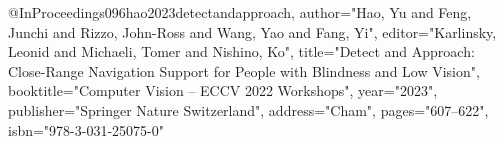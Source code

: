 @InProceedings{096hao2023detectandapproach,
author="Hao, Yu
and Feng, Junchi
and Rizzo, John-Ross
and Wang, Yao
and Fang, Yi",
editor="Karlinsky, Leonid
and Michaeli, Tomer
and Nishino, Ko",
title="Detect and Approach: Close-Range Navigation Support for People with Blindness and Low Vision",
booktitle="Computer Vision -- ECCV 2022 Workshops",
year="2023",
publisher="Springer Nature Switzerland",
address="Cham",
pages="607--622",
isbn="978-3-031-25075-0"
}